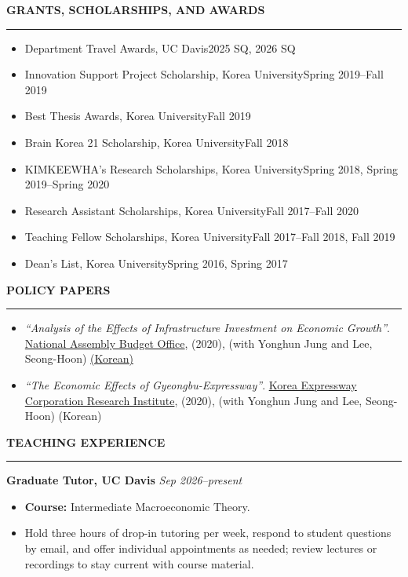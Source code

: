 \documentclass[11pt]{article}
\newcommand{\sechead}[1]{%
  \vspace{4pt}%
  {\normalsize\bfseries\uppercase{#1}}\\[-8pt]%
  \noindent\rule{\textwidth}{0.4pt}%
  \vspace{0.5pt}%
}
\newcommand{\subentry}[2]{%
  {\small\textbf{#1}} \hfill {\small\textit{#2}}\\
}
\newcommand{\pubitem}[2]{\item \textit{#1}. #2}
\newcommand{\plainitem}[1]{\item #1}
\newcommand{\dateditem}[2]{\item #1\hfill #2}
\newenvironment{cvresearchlist}
  {\begin{itemize}[leftmargin=*,topsep=3pt,itemsep=4pt,parsep=0pt,partopsep=0pt]\setlength{\emergencystretch}{1em}}
  {\end{itemize}}
\newenvironment{cvteachinglist}
  {\begin{itemize}[leftmargin=*,topsep=3pt,itemsep=2pt,parsep=0pt,partopsep=0pt]\raggedright}
  {\end{itemize}}
\begin{document}
\sechead{Grants, Scholarships, and Awards}
\vspace{-2em}
\begin{cvresearchlist}
    \dateditem{Department Travel Awards, UC Davis}{2025 SQ, 2026 SQ}
    \dateditem{Innovation Support Project Scholarship, Korea University}{Spring 2019--Fall 2019}
    \dateditem{Best Thesis Awards, Korea University}{Fall 2019}
    \dateditem{Brain Korea 21 Scholarship, Korea University}{Fall 2018}
    \dateditem{KIMKEEWHA’s Research Scholarships, Korea University}{Spring 2018, Spring 2019--Spring 2020}
    \dateditem{Research Assistant Scholarships, Korea University}{Fall 2017--Fall 2020}
    \dateditem{Teaching Fellow Scholarships, Korea University}{Fall 2017--Fall 2018, Fall 2019}
    \dateditem{Dean's List, Korea University}{Spring 2016, Spring 2017}
\end{cvresearchlist}


\sechead{Policy Papers}
\vspace{-2em}
\begin{cvresearchlist}
    \pubitem{“Analysis of the Effects of Infrastructure Investment on Economic Growth”}{\uline{National Assembly Budget Office}, (2020), (with Yonghun Jung and Lee, Seong-Hoon)} \href{https://www.nabo.go.kr/Sub/01Report/05_Board.jsp?funcSUB=view&bid=19&arg_cid1=0&arg_cid2=0&arg_class_id=0&currentPage=0&pageSize=10&currentPageSUB=0&pageSizeSUB=10&key_typeSUB=subject&keySUB=%EC%9D%B8%ED%94%84%EB%9D%BC&search_start_dateSUB=&search_end_dateSUB=&department=0&department_sub=0&etc_cate1=&etc_cate2=&sortBy=reg_date&ascOrDesc=desc&search_key1=&etc_1=0&etc_2=0&tag_key=&arg_id=7402&item_id=7402&etc_1=0&etc_2=0&name2=0}{ (Korean)}
    \pubitem{“The Economic Effects of Gyeongbu-Expressway”}{\uline{Korea Expressway Corporation Research Institute}, (2020), (with Yonghun Jung and Lee, Seong-Hoon)} (Korean)
\end{cvresearchlist}

\begingroup
\setlength{\parskip}{3pt}
\sechead{Teaching Experience}
\subentry{Graduate Tutor, UC Davis}{Sep 2026--present}
\vspace{-1.5em}
\begin{cvteachinglist}
    \plainitem{\textbf{Course:} Intermediate Macroeconomic Theory.}
    \plainitem{Hold three hours of drop-in tutoring per week, respond to student questions by email, and offer individual appointments as needed; review lectures or recordings to stay current with course material.}
\end{cvteachinglist}
\end{document}
